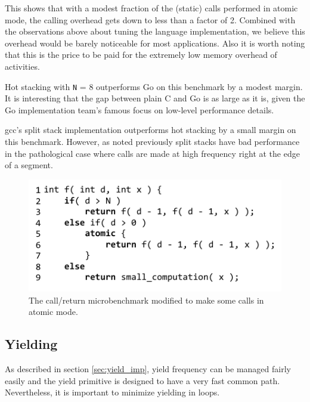 \documentclass[acmsmall,anonymous,review]{acmart}\settopmatter{printfolios=true,printccs=false,printacmref=false}
\begin{document}

This shows that with a modest fraction of the (static) calls performed in atomic mode, the calling overhead gets down to less than a factor of 2.
Combined with the observations above about tuning the language implementation, we believe this overhead would be barely noticeable for most applications.
Also it is worth noting that this is the price to be paid for the extremely low memory overhead of activities.

Hot stacking with \texttt{N} = 8 outperforms Go on this benchmark by a modest margin.
It is interesting that the gap between plain C and Go is as large as it is, given the Go implementation team's famous focus on low-level performance details.

gcc's split stack implementation outperforms hot stacking by a small margin on this benchmark.
However, as noted previously split stacks have bad performance in the pathological case where calls are made at high frequency right at the edge of a segment.

\begin{figure}
\includegraphics{Code/just_calling_n_benchmark}
\caption{The call/return microbenchmark modified to make some calls in atomic mode.}
\label{fig:micro_calling_n}
\end{figure}

\subsection{Yielding}

As described in section \ref{sec:yield_imp}, yield frequency can be managed fairly easily and the yield primitive is designed to have a very fast common path.
Nevertheless, it is important to minimize yielding in loops.
\end{document}
